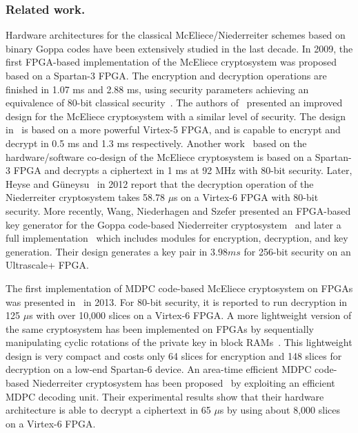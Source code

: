 \documentclass[runningheads]{llncs}
\begin{document}
\subsubsection{Related work.} 
Hardware architectures for the classical McEliece/Niederreiter 
schemes based on binary Goppa
codes have been extensively studied in the last decade. 
In 2009, the first FPGA-based implementation of the McEliece cryptosystem was proposed based on
a Spartan-3 FPGA. 
The encryption and decryption operations are finished in 1.07 ms and 2.88 ms, 
using security parameters achieving an equivalence of 80-bit classical security~\cite{eisenbarth2009microeliece}.
The authors of~\cite{shoufan2010novel} presented an improved design for the McEliece cryptosystem
with a similar level of security.
The design in~\cite{shoufan2010novel} is based on a more powerful Virtex-5 FPGA, 
and is capable to encrypt and decrypt in 0.5 ms and 1.3 ms respectively. 
Another work~\cite{ghosh2012speed} based on the
hardware/software co-design of the McEliece cryptosystem
is based on a Spartan-3 FPGA and decrypts a ciphertext in 1 ms at 
92 MHz with
80-bit security. 
Later, Heyse and G\"uneysu~\cite{heyse2012towards} in 2012 report 
that the decryption operation of the Niederreiter cryptosystem 
takes 58.78 $\mu$s on a Virtex-6 FPGA 
with 80-bit security.  
More recently, Wang, Niederhagen and Szefer presented 
an FPGA-based key generator for the Goppa code-based Niederreiter cryptosystem~\cite{wang2017fpga} and later a full implementation~\cite{wang2018fpga} which includes modules for encryption, decryption, and key generation. 
Their design generates a key pair in $3.98 ms$ for 256-bit security on an Ultrascale+ FPGA.

The first implementation of MDPC code-based McEliece cryptosystem on FPGAs 
was presented in~\cite{heyse2013smaller} in 2013. 
For 80-bit security, it is reported to run decryption in 125 $\mu$s 
with over 10,000 slices on a Virtex-6 FPGA. 
A more lightweight version of the same cryptosystem has been implemented 
on FPGAs by sequentially manipulating cyclic rotations of the private key in block RAMs~\cite{von2014lightweight}. 
This lightweight design is very compact and costs only 64 slices for encryption and 
148 slices for decryption on a low-end Spartan-6 device. 
An area-time efficient MDPC code-based Niederreiter cryptosystem has been proposed~\cite{hu2017area}
by exploiting an efficient MDPC decoding unit. 
Their experimental results show that their hardware architecture is able to decrypt a 
ciphertext in 65 $\mu$s by using about 8,000 slices on a Virtex-6 FPGA.
\end{document}
